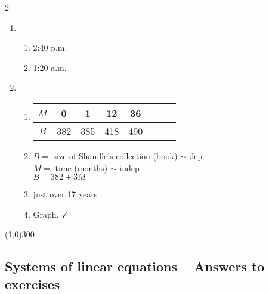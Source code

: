 \begin{multicols} {2}
\begin{enumerate}
\item %
\begin{enumerate}
\item 2:40 p.m.
\item 1:20 a.m.
\end{enumerate}

\item %
\begin{enumerate}
\item \begin{tabular} {|c| |c|c |c|c |c|c |c|}\hline
$M$ & 0 & 1 & 12 & 36 \\ \hline
$B$ & 382 & 385 & 418 & 490 \\ \hline
\end{tabular}
\item $B=$ size of Shanille's collection (book) $\sim$ dep \\ $M=$ time (months) $\sim$ indep \\ $B = 382 + 3M$
\item just over 17 years
\item Graph, $\checkmark$
\end{enumerate}

\end{enumerate}
\end{multicols}

\begin{center}
\line(1,0){300} %
\end{center}

\subsection {Systems of linear equations -- Answers to exercises} %

